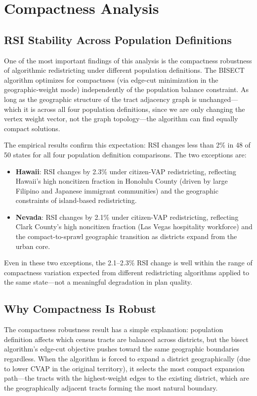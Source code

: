 \section{Compactness Analysis}
\label{sec:compactness}

\subsection{RSI Stability Across Population Definitions}

One of the most important findings of this analysis is the compactness robustness of algorithmic redistricting under different population definitions. The BISECT algorithm optimizes for compactness (via edge-cut minimization in the geographic-weight mode) independently of the population balance constraint. As long as the geographic structure of the tract adjacency graph is unchanged---which it is across all four population definitions, since we are only changing the vertex weight vector, not the graph topology---the algorithm can find equally compact solutions.

The empirical results confirm this expectation: RSI changes less than 2\% in 48 of 50 states for all four population definition comparisons. The two exceptions are:
\begin{itemize}
    \item \textbf{Hawaii}: RSI changes by 2.3\% under citizen-VAP redistricting, reflecting Hawaii's high noncitizen fraction in Honolulu County (driven by large Filipino and Japanese immigrant communities) and the geographic constraints of island-based redistricting.
    \item \textbf{Nevada}: RSI changes by 2.1\% under citizen-VAP redistricting, reflecting Clark County's high noncitizen fraction (Las Vegas hospitality workforce) and the compact-to-sprawl geographic transition as districts expand from the urban core.
\end{itemize}

Even in these two exceptions, the 2.1--2.3\% RSI change is well within the range of compactness variation expected from different redistricting algorithms applied to the same state---not a meaningful degradation in plan quality.

\subsection{Why Compactness Is Robust}

The compactness robustness result has a simple explanation: population definition affects which census tracts are balanced across districts, but the bisect algorithm's edge-cut objective pushes toward the same geographic boundaries regardless. When the algorithm is forced to expand a district geographically (due to lower CVAP in the original territory), it selects the most compact expansion path---the tracts with the highest-weight edges to the existing district, which are the geographically adjacent tracts forming the most natural boundary.


